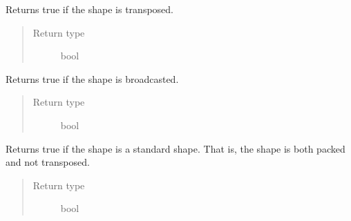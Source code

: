 \documentclass[letterpaper,10pt,english]{sphinxmanual}
\begin{document}

\begin{fulllineitems}
\label{\detokenize{reference/py:migraphx.transposed}}
\sphinxAtStartPar
Returns true if the shape is transposed.
\begin{quote}\begin{description}
\item[{Return type}] \leavevmode
\sphinxAtStartPar
bool

\end{description}\end{quote}

\end{fulllineitems}


\begin{fulllineitems}
\label{\detokenize{reference/py:migraphx.broadcasted}}
\sphinxAtStartPar
Returns true if the shape is broadcasted.
\begin{quote}\begin{description}
\item[{Return type}] \leavevmode
\sphinxAtStartPar
bool

\end{description}\end{quote}

\end{fulllineitems}


\begin{fulllineitems}
\label{\detokenize{reference/py:migraphx.standard}}
\sphinxAtStartPar
Returns true if the shape is a standard shape. That is, the shape is both packed and not transposed.
\begin{quote}\begin{description}
\item[{Return type}] \leavevmode
\sphinxAtStartPar
bool

\end{description}\end{quote}

\end{fulllineitems}
\end{document}
